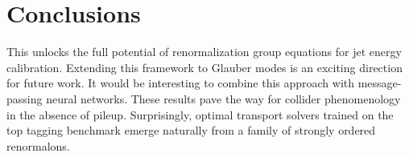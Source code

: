 \section{Conclusions}\label{sec:conclusions}

This unlocks the full potential of renormalization group equations for
jet energy calibration. Extending this framework to Glauber modes is an
exciting direction for future work. It would be interesting to combine
this approach with message-passing neural networks. These results pave
the way for collider phenomenology in the absence of pileup.
Surprisingly, optimal transport solvers trained on the top tagging
benchmark emerge naturally from a family of strongly ordered
renormalons.


